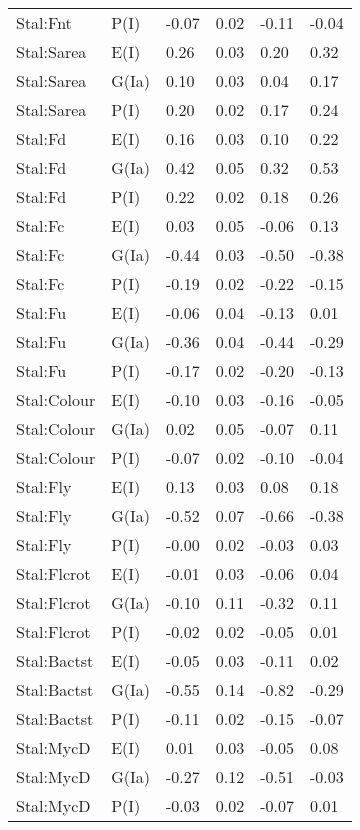 \begin{center}
\begin{longtable}{|p{1.1in}|p{0.7in}|p{0.7in}|p{0.6in}|p{0.6in}|p{0.6in}|}
  Stal:Fnt & P(I) & -0.07 & 0.02 & -0.11 & -0.04 \\ 
  Stal:Sarea & E(I) & 0.26 & 0.03 & 0.20 & 0.32 \\ 
  Stal:Sarea & G(Ia) & 0.10 & 0.03 & 0.04 & 0.17 \\ 
  Stal:Sarea & P(I) & 0.20 & 0.02 & 0.17 & 0.24 \\ 
  Stal:Fd & E(I) & 0.16 & 0.03 & 0.10 & 0.22 \\ 
  Stal:Fd & G(Ia) & 0.42 & 0.05 & 0.32 & 0.53 \\ 
  Stal:Fd & P(I) & 0.22 & 0.02 & 0.18 & 0.26 \\ 
  Stal:Fc & E(I) & 0.03 & 0.05 & -0.06 & 0.13 \\ 
  Stal:Fc & G(Ia) & -0.44 & 0.03 & -0.50 & -0.38 \\ 
  Stal:Fc & P(I) & -0.19 & 0.02 & -0.22 & -0.15 \\ 
  Stal:Fu & E(I) & -0.06 & 0.04 & -0.13 & 0.01 \\ 
  Stal:Fu & G(Ia) & -0.36 & 0.04 & -0.44 & -0.29 \\ 
  Stal:Fu & P(I) & -0.17 & 0.02 & -0.20 & -0.13 \\ 
  Stal:Colour & E(I) & -0.10 & 0.03 & -0.16 & -0.05 \\ 
  Stal:Colour & G(Ia) & 0.02 & 0.05 & -0.07 & 0.11 \\ 
  Stal:Colour & P(I) & -0.07 & 0.02 & -0.10 & -0.04 \\ 
  Stal:Fly & E(I) & 0.13 & 0.03 & 0.08 & 0.18 \\ 
  Stal:Fly & G(Ia) & -0.52 & 0.07 & -0.66 & -0.38 \\ 
  Stal:Fly & P(I) & -0.00 & 0.02 & -0.03 & 0.03 \\ 
  Stal:Flcrot & E(I) & -0.01 & 0.03 & -0.06 & 0.04 \\ 
  Stal:Flcrot & G(Ia) & -0.10 & 0.11 & -0.32 & 0.11 \\ 
  Stal:Flcrot & P(I) & -0.02 & 0.02 & -0.05 & 0.01 \\ 
  Stal:Bactst & E(I) & -0.05 & 0.03 & -0.11 & 0.02 \\ 
  Stal:Bactst & G(Ia) & -0.55 & 0.14 & -0.82 & -0.29 \\ 
  Stal:Bactst & P(I) & -0.11 & 0.02 & -0.15 & -0.07 \\ 
  Stal:MycD & E(I) & 0.01 & 0.03 & -0.05 & 0.08 \\ 
  Stal:MycD & G(Ia) & -0.27 & 0.12 & -0.51 & -0.03 \\ 
  Stal:MycD & P(I) & -0.03 & 0.02 & -0.07 & 0.01 \\ 

\end{longtable}
\end{center}
